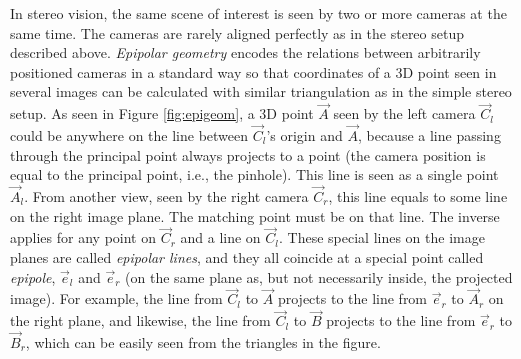 
In stereo vision, the same scene of interest is seen by two or more cameras at the same time.
The cameras are rarely aligned perfectly as in the stereo setup described above.
\emph{Epipolar geometry} \cite[ch. 7.3]{trucco1998introductory} encodes the relations between arbitrarily positioned cameras in a standard way so that coordinates of a 3D point seen in several images can be calculated with similar triangulation as in the simple stereo setup.
\cite{hartley03multiview}
As seen in Figure \ref{fig:epigeom}, a 3D point $\vec A$ seen by the left camera $\vec C_l$ could be anywhere on the line between $\vec C_l$'s origin and $\vec A$, because a line passing through the principal point always projects to a point (the camera position is equal to the principal point, i.e., the pinhole).
This line is seen as a single point $\vec A_l$.
From another view, seen by the right camera $\vec C_r$, this line equals to some line on the right image plane.
The matching point must be on that line.
The inverse applies for any point on $\vec C_r$ and a line on $\vec C_l$.
These special lines on the image planes are called \emph{epipolar lines}, and they all coincide at a special point called \emph{epipole}, $\vec e_l$ and $\vec e_r$ (on the same plane as, but not necessarily inside, the projected image).
For example, the line from $\vec C_l$ to $\vec A$ projects to the line from $\vec e_r$ to $\vec A_r$ on the right plane, and likewise, the line from $\vec C_l$ to $\vec B$ projects to the line from $\vec e_r$ to $\vec B_r$, which can be easily seen from the triangles in the figure.

